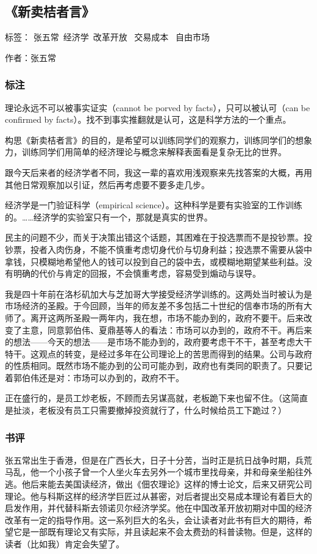 \subsection{《新卖桔者言》}

标签： 张五常\  经济学\ 改革开放 \ 交易成本 \ 自由市场

作者：张五常

\subsubsection{标注}
理论永远不可以被事实证实（cannot be porved by facts），只可以被认可（can be confirmed by facts）。找不到事实推翻就是认可，这是科学方法的一个重点。

构思《新卖桔者言》的目的，是希望可以训练同学们的观察力，训练同学们的想象力，训练同学们用简单的经济理论与概念来解释表面看是复杂无比的世界。

跟今天后来者的经济学者不同，我这一辈的喜欢用浅观察来先找答案的大概，再用其他日常观察加以引证，然后再考虑要不要多走几步。

经济学是一门验证科学（empirical science）。这种科学是要有实验室的工作训练的。……经济学的实验室只有一个，那就是真实的世界。

民主的问题不少，而关于决策出错这个话题，其困难在于投选票而不是投钞票。投钞票，投者入肉伤身，不能不慎重考虑切身代价与切身利益；投选票不需要从袋中拿钱，只模糊地希望他人的钱可以投到自己的袋中去，或模糊地期望某些利益。没有明确的代价与肯定的回报，不会慎重考虑，容易受到煽动与误导。

我是四十年前在洛杉矶加大与芝加哥大学接受经济学训练的。这两处当时被认为是市场经济的圣殿。于今回顾，当年的师友差不多包括二十世纪的信奉市场的所有大师了。离开这两所圣殿一两年内，我在想，市场不能办到的，政府不要干。后来改变了主意，同意郭伯伟、夏鼎基等人的看法：市场可以办到的，政府不干。再后来的想法——今天的想法——是市场不能办到的，政府要考虑干不干，甚至考虑大干特干。这观点的转变，是经过多年在公司理论上的苦思而得到的结果。公司与政府的性质相同。既然市场不能办到的公司可能办到，政府也有类同的职责了。只要记着郭伯伟还是对：市场可以办到的，政府不干。

正在盛行的，是员工炒老板，不顾而去另谋高就，老板跪下来也留不住。（这简直是扯淡，老板没有员工只需要撤掉投资就行了，什么时候给员工下跪过？）

\subsubsection{书评}
张五常出生于香港，但是在广西长大，日子十分苦，当时正是抗日战争时期，兵荒马乱，他一个小孩子曾一个人坐火车去另外一个城市里找母亲，并和母亲坐船往外逃。他后来能去美国读经济，做出《佃农理论》这样的博士论文，后来又研究公司理论。他与科斯这样的经济学巨匠过从甚密，对后者提出交易成本理论有着巨大的启发作用，并代替科斯去领诺贝尔经济学奖。他在中国改革开放初期对中国的经济改革有一定的指导作用。这一系列巨大的名头，会让读者对此书有巨大的期待，希望它是一部既有理论又有实际，并且读起来不会太费劲的科普读物。但是，这样的读者（比如我）肯定会失望了。

